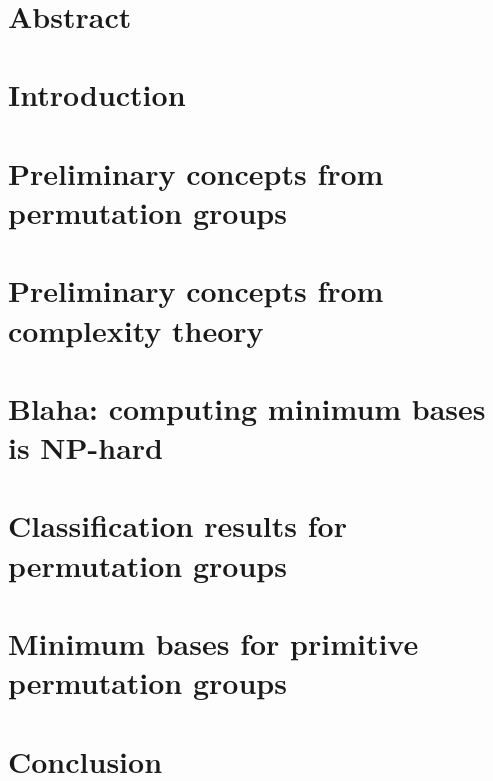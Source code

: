 \documentclass[openany]{book}
\title{\textbf{\TITLE}}
\author{\textbf{\AUTHOR}}
\date{\textbf{\DATE}}
\begin{document}



\chapter*{Abstract}



\tableofcontents

\chapter{Introduction}




\chapter{Preliminary concepts from permutation groups}



\chapter{Preliminary concepts from complexity theory}



\chapter{Blaha: computing minimum bases is NP-hard}



\chapter{Classification results for permutation groups}



\chapter{Minimum bases for primitive permutation groups}



\chapter{Conclusion}



\nocite{*}
\renewcommand{\bibname}{References}

\appendix


\end{document}
